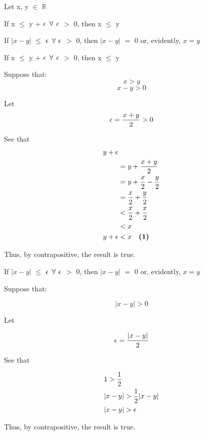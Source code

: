 \documentclass{article}
\begin{document}

Let x, y $\in$ $\mathbb{R}$

\balist
\item If x $\leq$ y + $\epsilon$ $\forall$ $\epsilon$ $>$ $0$, then x $\leq$ y
\item If $|x - y|$ $\leq$ $\epsilon$ $\forall$ $\epsilon$ $>$ $0$, then $|x - y|$ $=$ $0$ or, evidently, $x = y$
\elist

If x $\leq$ y + $\epsilon$ $\forall$ $\epsilon$ $>$ $0$, then x $\leq$ y
\bgpf

Suppose that:
$$ x > y $$
$$ x - y > 0 $$

\bigskip

Let $$ \epsilon = \frac{x + y}{2} > 0$$

See that
\[
            \begin{split}
                y + \epsilon  & 
                \\
                &= y + \frac{x + y}{2}
                \\
                &= y + \frac{x}{2} - \frac{y}{2}
                \\
                &= \frac{x}{2} + \frac{y}{2}
                \\
                &< \frac{x}{2} + \frac{x}{2}
                \\
                &< x
                \\
                y + \epsilon  &< x ~~~\textbf{(1)}
            \end{split}
\]

Thus, by contrapositive, the result is true.

\epf
\pagebreak
{}

If $|x - y|$ $\leq$ $\epsilon$ $\forall$ $\epsilon$ $>$ $0$, then $|x - y|$ $=$ $0$ or, evidently, $x = y$

\bgpf

Suppose that:

$$|x - y| > 0$$

Let

$$ \epsilon = \frac{|x - y|}{2} $$

See that

\[
            \begin{split}
                &1 > \frac{1}{2}
                \\
                &|x - y| > \frac{1}{2}|x - y|
                \\
                &|x - y| > \epsilon
            \end{split}
\]

Thus, by contrapositive, the result is true.

\epf
\end{document}
